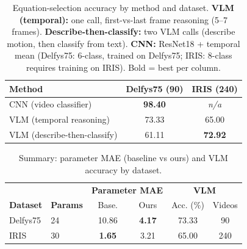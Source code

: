 \begin{table}[t]
  \centering
  \caption{Equation-selection accuracy by method and dataset. \textbf{VLM (temporal):} one call, first-vs-last frame reasoning (5--7 frames). \textbf{Describe-then-classify:} two VLM calls (describe motion, then classify from text). \textbf{CNN:} ResNet18 + temporal mean (Delfys75: 6-class, trained on Delfys75; IRIS: 8-class requires training on IRIS). Bold = best per column.}
  \label{tab:summary_vlm_methods}
  \small
  \setlength{\tabcolsep}{6pt}
  \renewcommand{\arraystretch}{1.2}
  \begin{tabular}{@{}lcc@{}}
    \toprule
    \textbf{Method} & \textbf{Delfys75 (90)} & \textbf{IRIS (240)} \\
    \midrule
    CNN (video classifier)   & \cellcolor{bestcolor}\textbf{98.40} & \textit{n/a} \\
    VLM (temporal reasoning) & 73.33 & 65.00 \\
    VLM (describe-then-classify) & 61.11 & \cellcolor{bestcolor}\textbf{72.92} \\
    \bottomrule
  \end{tabular}
\end{table}

\begin{table}[t]
  \centering
  \caption{Summary: parameter MAE (baseline vs ours) and VLM accuracy by dataset.}
  \label{tab:summary_both}
  \small
  \setlength{\tabcolsep}{4pt}
  \renewcommand{\arraystretch}{1.2}
  \begin{tabular}{@{}llcccc@{}}
    \toprule
    & & \multicolumn{2}{c}{\textbf{Parameter MAE}} & \multicolumn{2}{c}{\textbf{VLM}} \\
    \textbf{Dataset} & \textbf{Params} & Base. & Ours & Acc. (\%) & Videos \\
    \midrule
    Delfys75 & 24 & 10.86 & \cellcolor{bestcolor}\textbf{4.17} & 73.33 & 90 \\
    IRIS     & 30 & \cellcolor{bestcolor}\textbf{1.65} & 3.21 & 65.00 & 240 \\
    \bottomrule
  \end{tabular}
\end{table}
